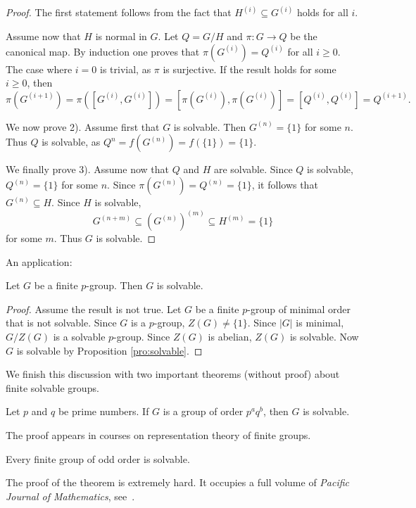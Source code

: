 \begin{proof}
    The first statement follows from the fact that
    $H^{(i)}\subseteq G^{(i)}$ holds for all $i$. 
 
    Assume now that $H$ is normal in $G$. 
    Let $Q=G/H$ and $\pi\colon G\to Q$ be the canonical map.
    By induction one proves that $\pi(G^{(i)})=Q^{(i)}$ for all $i\geq0$.
    The case where $i=0$ is trivial, as $\pi$ is surjective. 
    If the result holds for some $i\geq0$, then
    \[
            \pi(G^{(i+1)})=\pi([G^{(i)},G^{(i)}])=[\pi(G^{(i)}),\pi(G^{(i)})]=[Q^{(i)},Q^{(i)}]=Q^{(i+1)}.
    \]

    We now prove 2). Assume first that $G$ is solvable. Then $G^{(n)}=\{1\}$ for some $n$. 
    Thus $Q$ is solvable, as $Q^{n}=f(G^{(n)})=f(\{1\})=\{1\}$. 

    We finally prove 3). Assume now that $Q$ and $H$ are solvable. 
    Since $Q$ is solvable, $Q^{(n)}=\{1\}$ for some $n$.
    Since $\pi(G^{(n)})=Q^{(n)}=\{1\}$, it follows that
    $G^{(n)}\subseteq H$. Since $H$
    is solvable, 
    \[
        G^{(n+m)}\subseteq (G^{(n)})^{(m)}\subseteq H^{(m)}=\{1\}
    \]
    for some $m$. Thus $G$ is solvable.
\end{proof}

An application:

\begin{proposition}
    Let $G$ be a finite $p$-group. Then $G$ is solvable. 
\end{proposition}

\begin{proof}
    Assume the result is not true. Let $G$ be a finite
    $p$-group of minimal order that is not solvable. Since 
    $G$ is a $p$-group, $Z(G)\ne\{1\}$. Since $|G|$ is minimal, 
    $G/Z(G)$ is a solvable $p$-group. Since $Z(G)$ is abelian, 
    $Z(G)$ is solvable. Now $G$ is solvable 
    by Proposition \ref{pro:solvable}.
\end{proof}

We finish this discussion with two important theorems (without proof) 
about finite solvable groups. 

\begin{theorem}[Burnside]
    Let $p$ and $q$ be prime numbers. If $G$ is a group
    of order $p^aq^b$, then $G$ is solvable. 
\end{theorem}

The proof appears in courses on representation theory of finite groups. 

\begin{theorem}
    Every finite group of odd order is solvable.
\end{theorem}

The proof of the theorem is extremely hard. It occupies a full volume of
\emph{Pacific Journal of Mathematics}, see~\cite{MR166261}.

